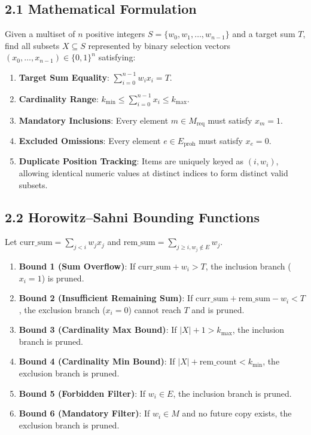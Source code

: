 \documentclass[12pt]{article}
\begin{document}
\subsection*{2.1 Mathematical Formulation}
Given a multiset of $n$ positive integers $S = \{w_0, w_1, \dots, w_{n-1}\}$ and a target sum $T$, find all subsets $X \subseteq S$ represented by binary selection vectors $(x_0, \dots, x_{n-1}) \in \{0, 1\}^n$ satisfying:
\begin{enumerate}
    \item \textbf{Target Sum Equality}: $\sum_{i=0}^{n-1} w_i x_i = T$.
    \item \textbf{Cardinality Range}: $k_{\min} \le \sum_{i=0}^{n-1} x_i \le k_{\max}$.
    \item \textbf{Mandatory Inclusions}: Every element $m \in M_{\text{req}}$ must satisfy $x_m = 1$.
    \item \textbf{Excluded Omissions}: Every element $e \in E_{\text{proh}}$ must satisfy $x_e = 0$.
    \item \textbf{Duplicate Position Tracking}: Items are uniquely keyed as $(i, w_i)$, allowing identical numeric values at distinct indices to form distinct valid subsets.
\end{enumerate}

\subsection*{2.2 Horowitz--Sahni Bounding Functions}
Let $\text{curr\_sum} = \sum_{j < i} w_j x_j$ and $\text{rem\_sum} = \sum_{j \ge i, w_j \notin E} w_j$.
\begin{enumerate}
    \item \textbf{Bound 1 (Sum Overflow)}: If $\text{curr\_sum} + w_i > T$, the inclusion branch ($x_i = 1$) is pruned.
    \item \textbf{Bound 2 (Insufficient Remaining Sum)}: If $\text{curr\_sum} + \text{rem\_sum} - w_i < T$, the exclusion branch ($x_i = 0$) cannot reach $T$ and is pruned.
    \item \textbf{Bound 3 (Cardinality Max Bound)}: If $|X| + 1 > k_{\max}$, the inclusion branch is pruned.
    \item \textbf{Bound 4 (Cardinality Min Bound)}: If $|X| + \text{rem\_count} < k_{\min}$, the exclusion branch is pruned.
    \item \textbf{Bound 5 (Forbidden Filter)}: If $w_i \in E$, the inclusion branch is pruned.
    \item \textbf{Bound 6 (Mandatory Filter)}: If $w_i \in M$ and no future copy exists, the exclusion branch is pruned.
\end{enumerate}
\end{document}
